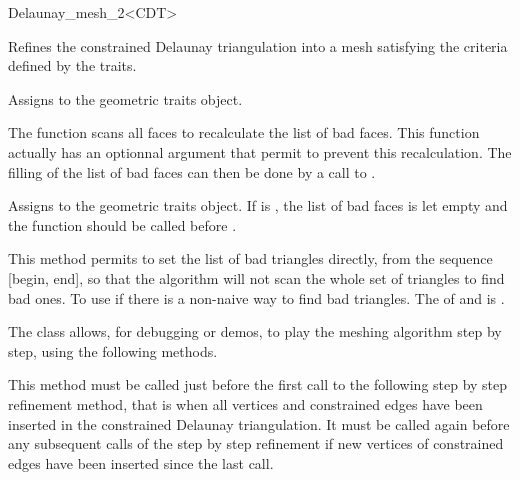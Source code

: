 \begin{ccRefClass}{Delaunay_mesh_2<CDT>}

{ Refines the constrained Delaunay triangulation into a mesh
  satisfying the criteria defined by the traits.
}

{ Assigns  to the geometric traits object. }

\begin{ccAdvanced}
  The function  scans all faces to recalculate the
  list of bad faces. This function actually has an optionnal argument that
  permit to prevent this recalculation. The filling of the list of bad
  faces can then be done by a call to .
  
  { Assigns  to the geometric traits object. If
     is , the list of bad faces is
    let empty and the function  should be called before
    .}

                   { This method permits to set the list of bad triangles
                     directly, from the sequence [begin, end], so that the
                     algorithm will not scan the whole set of triangles to
                     find bad ones. To use if there is a non-naive way to
                     find bad triangles.  \ccPrecond The 
                     of  and  is .}

\end{ccAdvanced}


\begin{ccAdvanced}

The \ccRefName{} class allows, for debugging or demos, to play the
meshing algorithm step by step, using the following methods.

         { This method must be called just before the first
             call to the following step by step refinement method,
             that is when all vertices and constrained edges have been
             inserted in the constrained Delaunay triangulation. It
             must be called again before any subsequent calls of the
             step by step refinement if new vertices of constrained
             edges have been inserted since the last call.}


\end{ccAdvanced}
\end{ccRefClass}
